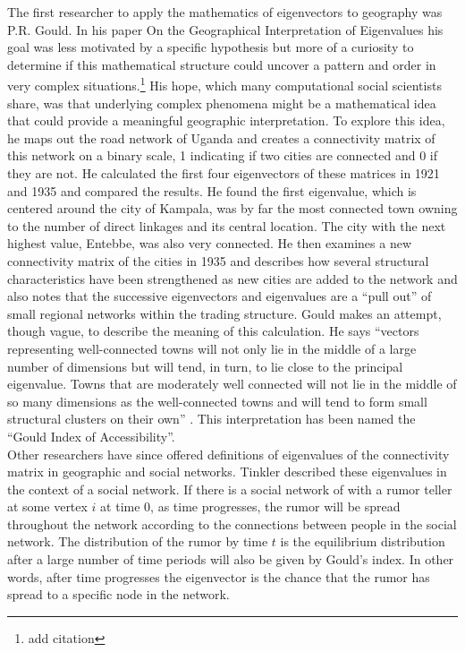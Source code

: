 \documentclass{article}
\theoremstyle{definition}
\theoremstyle{remark}
\begin{document}
The first researcher to apply the mathematics of eigenvectors to geography was P.R. Gould.  In his paper On the Geographical Interpretation of Eigenvalues his goal was less motivated by a specific hypothesis but more of a curiosity to determine if this mathematical structure could uncover a pattern and order in very complex situations.\footnote{add citation}  His hope, which many computational social scientists share, was that underlying complex phenomena might be a mathematical idea that could provide a meaningful geographic interpretation.  To explore this idea, he maps out the road network of Uganda and creates a connectivity matrix of this network on a binary scale, 1 indicating if two cities are connected and 0 if they are not.  He calculated the first four eigenvectors of these matrices in 1921 and 1935 and compared the results.  He found the first eigenvalue, which is centered around the city of Kampala, was by far the most connected town owning to the number of direct linkages and its central location.  The city with the next highest value, Entebbe, was also very connected.  He then examines a new connectivity matrix of the cities in 1935 and describes how several structural characteristics have been strengthened as new cities are added to the network and also notes that the successive eigenvectors and eigenvalues are a “pull out” of small regional networks within the trading structure.  Gould makes an attempt, though vague, to describe the meaning of this calculation.  He says “vectors representing well-connected towns will not only lie in the middle of a large number of dimensions but will tend, in turn, to lie close to the principal eigenvalue.  Towns that are moderately well connected will not lie in the middle of so many dimensions as the well-connected towns and will tend to form small structural clusters on their own” .  This interpretation has been named the “Gould Index of Accessibility”.\\

Other researchers have since offered definitions of eigenvalues of the connectivity matrix in geographic and social networks.  Tinkler described these eigenvalues in the context of a social network.  If there is a social network of with a rumor teller at some vertex $i$ at time 0, as time progresses, the rumor will be spread throughout the network according to the connections between people in the social network.  The distribution of the rumor by time $t$ is the equilibrium distribution after a large number of time periods will also be given by Gould’s index.   In other words, after time progresses the eigenvector is the chance that the rumor has spread to a specific node in the network. \\
\end{document}
